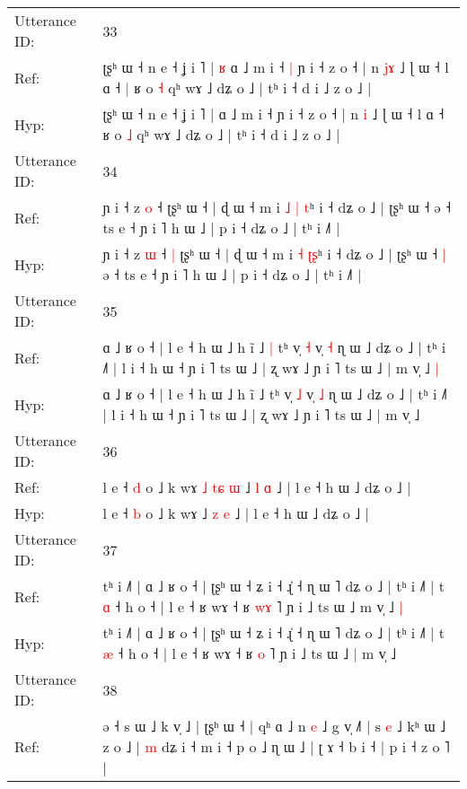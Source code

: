 \documentclass[10pt]{article}
\DeclareRobustCommand{\hl}[1]{{\textcolor{red}{#1}}}
\begin{document}
\begin{longtable}{ll}
 \\
\midrule
Utterance ID: & 33 \\
Ref: & ʈʂʰ ɯ ˧ n e ˧ ʝ i ˥ |\hl{ }\hl{ʁ} ɑ ˩ m i ˧\hl{ }\hl{|} ɲ i ˧ z o ˧ | n \hl{j}\hl{ɤ} ˩ ɭ ɯ ˧ l ɑ ˧\hl{ }\hl{|} ʁ o \hl{˧} qʰ wɤ ˩ dʑ o ˩ | tʰ i ˧ d i ˩ z o ˩ |
 \\
Hyp: & ʈʂʰ ɯ ˧ n e ˧ ʝ i ˥ |\hl{}\hl{} ɑ ˩ m i ˧\hl{}\hl{} ɲ i ˧ z o ˧ | n \hl{}\hl{i} ˩ ɭ ɯ ˧ l ɑ ˧\hl{}\hl{} ʁ o \hl{˩} qʰ wɤ ˩ dʑ o ˩ | tʰ i ˧ d i ˩ z o ˩ |
 \\
\midrule
Utterance ID: & 34 \\
Ref: & ɲ i ˧ z \hl{o} ˧\hl{}\hl{} ʈʂʰ ɯ ˧ | ɖ ɯ ˧ m i \hl{˩} \hl{|}\hl{ }\hl{t}ʰ i ˧ dʑ o ˩ | ʈʂʰ ɯ ˧\hl{}\hl{} ə ˧ ts e ˧ ɲ i ˥ h ɯ ˩ | p i ˧ dʑ o ˩ | tʰ i ˩˥ |
 \\
Hyp: & ɲ i ˧ z \hl{ɯ} ˧\hl{ }\hl{|} ʈʂʰ ɯ ˧ | ɖ ɯ ˧ m i \hl{˧} \hl{}\hl{ʈ}\hl{ʂ}ʰ i ˧ dʑ o ˩ | ʈʂʰ ɯ ˧\hl{ }\hl{|} ə ˧ ts e ˧ ɲ i ˥ h ɯ ˩ | p i ˧ dʑ o ˩ | tʰ i ˩˥ |
 \\
\midrule
Utterance ID: & 35 \\
Ref: & ɑ ˩ ʁ o ˧ | l e ˧ h ɯ ˩ h ĩ ˩\hl{ }\hl{|} tʰ v̩ \hl{˧} v̩ \hl{˧} ɳ ɯ ˩ dʑ o ˩ | tʰ i ˩˥ | l i ˧ h ɯ ˧ ɲ i ˥ ts ɯ ˩ | ʐ wɤ ˩ ɲ i ˥ ts ɯ ˩ | m v̩ ˩\hl{ }\hl{|}
 \\
Hyp: & ɑ ˩ ʁ o ˧ | l e ˧ h ɯ ˩ h ĩ ˩\hl{}\hl{} tʰ v̩ \hl{˩} v̩ \hl{˩} ɳ ɯ ˩ dʑ o ˩ | tʰ i ˩˥ | l i ˧ h ɯ ˧ ɲ i ˥ ts ɯ ˩ | ʐ wɤ ˩ ɲ i ˥ ts ɯ ˩ | m v̩ ˩\hl{}\hl{}
 \\
\midrule
Utterance ID: & 36 \\
Ref: & l e ˧ \hl{d} o ˩ k wɤ\hl{ }\hl{˩}\hl{ }\hl{t}\hl{ɕ}\hl{ }\hl{ɯ} ˩ \hl{l} \hl{ɑ} ˩ | l e ˧ h ɯ ˩ dʑ o ˩ |
 \\
Hyp: & l e ˧ \hl{b} o ˩ k wɤ\hl{}\hl{}\hl{}\hl{}\hl{}\hl{}\hl{} ˩ \hl{z} \hl{e} ˩ | l e ˧ h ɯ ˩ dʑ o ˩ |
 \\
\midrule
Utterance ID: & 37 \\
Ref: & tʰ i ˩˥ | ɑ ˩ ʁ o ˧ | ʈʂʰ ɯ ˧ ʑ i ˧ ɻ̍ ˧ ɳ ɯ ˥ dʑ o ˩ | tʰ i ˩˥ | t \hl{ɑ} ˧ h o ˧ | l e ˧ ʁ wɤ ˧ ʁ \hl{w}\hl{ɤ} ˥ ɲ i ˩ ts ɯ ˩\hl{}\hl{} m v̩ ˩\hl{ }\hl{|}
 \\
Hyp: & tʰ i ˩˥ | ɑ ˩ ʁ o ˧ | ʈʂʰ ɯ ˧ ʑ i ˧ ɻ̍ ˧ ɳ ɯ ˥ dʑ o ˩ | tʰ i ˩˥ | t \hl{æ} ˧ h o ˧ | l e ˧ ʁ wɤ ˧ ʁ \hl{}\hl{o} ˥ ɲ i ˩ ts ɯ ˩\hl{ }\hl{|} m v̩ ˩\hl{}\hl{}
 \\
\midrule
Utterance ID: & 38 \\
Ref: & ə ˧ s ɯ ˩ k v̩ ˩ | ʈʂʰ ɯ ˧ | qʰ ɑ ˩ n \hl{e} ˩ g v̩ ˩˥ | s \hl{e} ˩ kʰ ɯ ˩ z o ˩ | \hl{}\hl{}\hl{}\hl{m} dʑ i ˧ m i ˧ p o ˩ ɳ ɯ ˩ | ʈ ɤ ˧ b i ˧ | p i ˧ z o ˥ |

\end{longtable}
\end{document}
